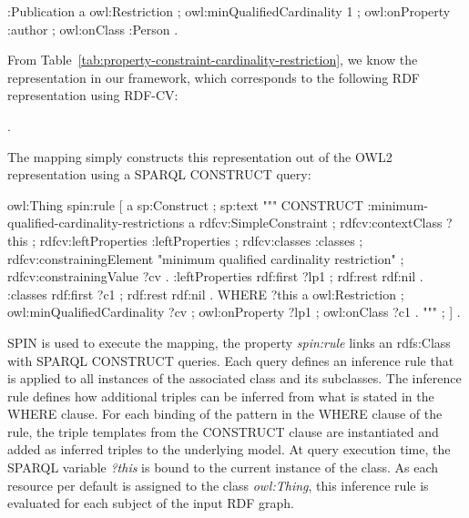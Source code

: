 \documentclass[a4paper,fontsize=11pt]{scrartcl}
\begin{document}
\begin{ex}[commandchars=\\\{\}]
:Publication 
    a owl:Restriction ;
    owl:minQualifiedCardinality 1 ;
    owl:onProperty :author ;
    owl:onClass :Person .
\end{ex}

From Table~\ref{tab:property-constraint-cardinality-restriction}, we know the representation in our framework, which corresponds to the following 
RDF representation using RDF-CV:

\begin{ex} .
\end{ex}

The mapping simply constructs this representation out of the OWL2 representation using a SPARQL CONSTRUCT query: 

\begin{ex}
owl:Thing 
    spin:rule [ a sp:Construct ; sp:text """
        CONSTRUCT {            
            :minimum-qualified-cardinality-restrictions
                a rdfcv:SimpleConstraint ;
                rdfcv:contextClass ?this ;
                rdfcv:leftProperties :leftProperties ;
                rdfcv:classes :classes ;
                rdfcv:constrainingElement "minimum qualified cardinality restriction" ;
                rdfcv:constrainingValue ?cv .  
            :leftProperties 
                rdf:first ?lp1 ;
                rdf:rest rdf:nil .    
            :classes 
                rdf:first ?c1 ;
                rdf:rest rdf:nil . }
        WHERE {
            ?this
                a owl:Restriction ;
                owl:minQualifiedCardinality ?cv ;
                owl:onProperty ?lp1 ;
                owl:onClass ?c1 . } """ ; ] .
\end{ex}

SPIN is used to execute the mapping, the property \emph{spin:rule} links an rdfs:Class with SPARQL CONSTRUCT queries. Each query defines an inference rule that is applied to all instances of the associated class and its subclasses. The inference rule defines how additional triples can be inferred from what is stated in the WHERE clause. For each binding of the pattern in the WHERE clause of the rule, the triple templates from the CONSTRUCT clause are instantiated and added as inferred triples to the underlying model. At query execution time, the SPARQL variable \emph{?this} is bound to the current instance of the class. As each resource per default is assigned to the class \emph{owl:Thing}, this inference rule is evaluated for each subject of the input RDF graph.
\end{document}
